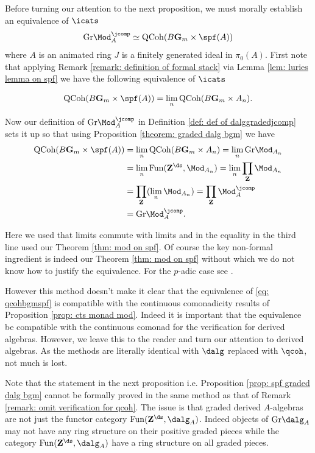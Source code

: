 \documentclass[10pt,reqno]{amsart}
\numberwithin{equation}{section}
\newcommand{\G}{\mathbf{G}}
\newcommand{\ZZ}{\mathbf{Z}}
\newcommand{\Fun}{\mathrm{Fun}}
\newcommand{\Qcoh}{\mathrm{QCoh}}
\newcommand{\Gr}{\mathrm{Gr}}
\begin{document}
\begin{remark}\label{remark: omit verification for qcoh}
    Before turning our attention to the next proposition, we must morally establish an equivalence of $\icats$ $$\Gr\Mod_A^\jcomp\simeq \Qcoh(B\G_m\times \spf(A))$$ where $A$ is an animated ring $J$ is a finitely generated ideal in $\pi_0(A)$. First note that applying Remark \ref{remark: definition of formal stack} via Lemma \ref{lem: luries lemma on spf} we have the following equivalence of $\icats$

    $$\Qcoh(B\G_m\times \spf(A))=\lim_n\Qcoh(B\G_m\times A_n).$$

   Now our definition of $\Gr\Mod_A^\jcomp$ in Definition \ref{def: def of dalggradedjcomp} sets it up so that using Proposition \ref{theorem: graded dalg bgm} we have 
    \begin{align}\label{eq: qcohbgmspf}
        \Qcoh(B\G_m\times \spf(A))&=\lim_n\Qcoh(B\G_m\times A_n)=\lim_n \Gr\Mod_{A_n}\\ &=\lim_n \Fun(\ZZ^\ds, \Mod_{A_n})=\lim_n \prod_{\ZZ} \Mod_{A_n}\notag\\
        &=\prod_{\ZZ} (\lim_n \Mod_{A_n})=\prod_{\ZZ} \Mod_A^{\jcomp}\notag\\
        &=\Gr\Mod_A^{\jcomp}.
    \end{align}

    Here we used that limits commute with limits and in the equality in the third line used our Theorem \ref{thm: mod on spf}. Of course the key non-formal ingredient is indeed our Theorem \ref{thm: mod on spf} without which we do not know how to justify the equivalence. For the $p$-adic case see \cite[Example A.13]{AntieauKrauseNikolaus2023PrismaticDeltaRings}.

    However this method doesn't make it clear that the equivalence of \ref{eq: qcohbgmspf} is compatible with the continuous comonadicity results of Proposition \ref{prop: cts monad mod}. Indeed it is important that the equivalence be compatible with the continuous comonad for the verification for derived algebras. However, we leave this to the reader and turn our attention to derived algebras. As the methods are literally identical with $\dalg$ replaced with $\qcoh$, not much is lost.
\end{remark}

\begin{remark}\label{remark: grdalg is not formal}
   Note that the statement in the next proposition i.e. Proposition \ref{prop: spf graded dalg bgm} cannot be formally proved in the same method as that of Remark \ref{remark: omit verification for qcoh}. The issue is that graded derived $A$-algebras are not just the functor category $\Fun(\ZZ^\ds, \dalg_A)$. Indeed objects of $\Gr\dalg_A$ may not have any ring structure on their positive graded pieces while the category $\Fun(\ZZ^\ds, \dalg_A)$ have a ring structure on all graded pieces.
\end{remark}
\end{document}
